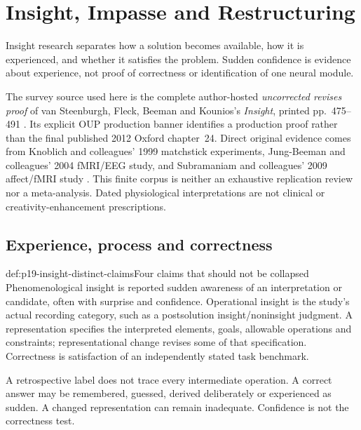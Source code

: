 \chapter{Insight, Impasse and Restructuring}
\label{sec:p19-insight-impasse-restructuring}

Insight research separates how a solution becomes available, how it is
experienced, and whether it satisfies the problem. Sudden confidence is
evidence about experience, not proof of correctness or identification
of one neural module.

The survey source used here is the complete author-hosted
\emph{uncorrected revises proof} of van Steenburgh, Fleck, Beeman and
Kounios's \emph{Insight}, printed pp.~475--491
\parencite{VanSteenburghEtAl2012InsightRevises}.
Its explicit OUP production banner identifies a production proof rather
than the final published 2012 Oxford chapter~24. Direct original evidence comes from
Knoblich and colleagues' 1999 matchstick experiments, Jung-Beeman and
colleagues' 2004 fMRI/EEG study, and Subramaniam and colleagues' 2009
affect/fMRI study \parencite{KnoblichEtAl1999ConstraintsChunks,
JungBeemanEtAl2004NeuralInsight,SubramaniamEtAl2009PositiveAffect}.
This finite corpus is neither an exhaustive replication review nor a
meta-analysis. Dated physiological interpretations are not clinical
or creativity-enhancement prescriptions.

\section{Experience, process and correctness}
\label{sec:p19-insight-operations}

\begin{hbdefinition}{def:p19-insight-distinct-claims}{Four claims that should not be collapsed}
Phenomenological insight is reported sudden awareness of an interpretation
or candidate, often with surprise and confidence.
Operational insight is the study's actual recording category, such as
a postsolution insight/noninsight judgment.
A representation specifies the interpreted elements, goals, allowable
operations and constraints; representational change revises some of that
specification.
Correctness is satisfaction of an independently stated task benchmark.

A retrospective label does not trace every intermediate operation.
A correct answer may be remembered, guessed, derived deliberately or
experienced as sudden. A changed representation can remain inadequate.
Confidence is not the correctness test.
\end{hbdefinition}

